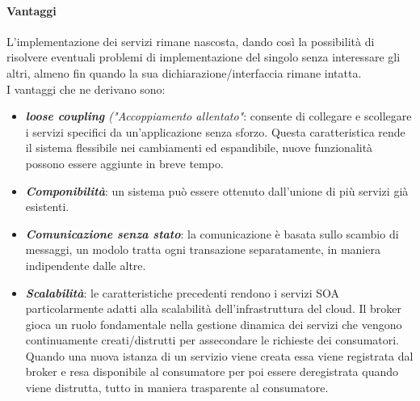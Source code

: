 \documentclass{article}
\begin{document}
\paragraph{Vantaggi}
L'implementazione dei servizi rimane nascosta, dando così la possibilità di risolvere eventuali problemi di implementazione del singolo senza interessare gli altri, almeno fin quando la sua dichiarazione/interfaccia rimane intatta. \\ 
I vantaggi che ne derivano sono:
\begin{itemize}
    \item \textit{\textbf{loose coupling} ("Accoppiamento allentato"}: consente di collegare e scollegare i servizi specifici da un'applicazione senza sforzo. Questa caratteristica rende il sistema flessibile nei cambiamenti ed espandibile, nuove funzionalità possono essere aggiunte in breve tempo.
    \item \textit{\textbf{Componibilità}}: un sistema può essere ottenuto dall'unione di più servizi già esistenti.
    \item \textit{\textbf{Comunicazione senza stato}}: la comunicazione è basata sullo scambio di messaggi, un modolo tratta ogni transazione separatamente, in maniera indipendente dalle altre.
    \item \textit{\textbf{Scalabilità}}: le caratteristiche precedenti rendono i servizi SOA particolarmente adatti alla scalabilità dell'infrastruttura del cloud. Il broker gioca un ruolo fondamentale nella gestione dinamica dei servizi che vengono continuamente creati/distrutti per assecondare le richieste dei consumatori. Quando una nuova istanza di un servizio viene creata essa viene registrata dal broker e resa disponibile al consumatore per poi essere deregistrata quando viene distrutta, tutto in maniera trasparente al consumatore.
\end{itemize}
\end{document}

